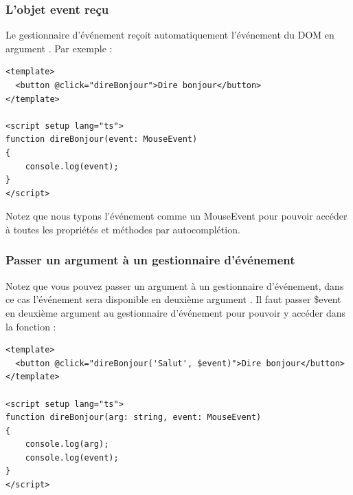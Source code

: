 \documentclass{article}
\begin{document}
\subsubsection{L'objet {\color{monOrange}event} reçu}
Le gestionnaire d'événement reçoit automatiquement l'événement du DOM en argument . Par exemple :
\begin{verbatim}
<template>
  <button @click="direBonjour">Dire bonjour</button>
</template>

<script setup lang="ts">
function direBonjour(event: MouseEvent)
{
    console.log(event);
}
</script>
\end{verbatim}
Notez que nous typons l'événement comme un {\color{monOrange}MouseEvent} pour pouvoir accéder à toutes les propriétés et méthodes par autocomplétion.

\subsubsection{Passer un argument à un gestionnaire d'événement}
Notez que vous pouvez passer un argument à un gestionnaire d'événement, dans ce cas l'événement sera disponible en deuxième argument . Il faut passer {\color{monOrange}\$event} en deuxième argument au gestionnaire d'événement pour pouvoir y accéder dans la fonction :
\begin{verbatim}
<template>
  <button @click="direBonjour('Salut', $event)">Dire bonjour</button>
</template>

<script setup lang="ts">
function direBonjour(arg: string, event: MouseEvent)
{
    console.log(arg);
    console.log(event);
}
</script>
\end{verbatim}
\end{document}
